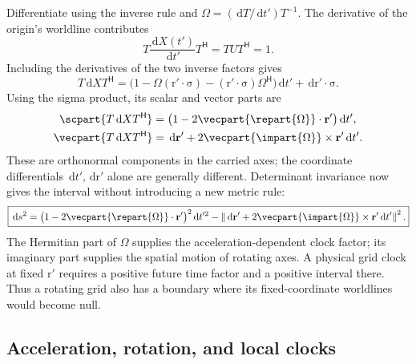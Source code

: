 \documentclass[11pt]{article}
\newcommand{\pv}[1]{{#1}}
\newcommand{\pvGreek}[1]{{#1}}
\newcommand{\vstyle}[1]{{\bm{\mathrm{#1}}}}
\newcommand{\pT}{\pv{T}}
\newcommand{\pU}{\pv{U}}
\newcommand{\pX}{\pv{X}}
\newcommand{\pvOmega}{\pvGreek{\Omega}}
\numberwithin{equation}{section}
\newcommand{\dotprod}{\cdot}
\newcommand{\bsig}{\vstyle{\sigma}}
\newcommand{\br}{\vstyle{r}}
\newcommand{\dd}{\,\mathrm d}
\begin{document}
Differentiate using the inverse rule and
$\pvOmega=(\dd\pT/\dd t')\pT^{-1}$. The derivative of the origin's
worldline contributes
\[
 \pT\frac{\dd\pX(t')}{\dd t'}\pT^{\mathsf H}
 =\pT\pU\pT^{\mathsf H}=1.
\]
Including the derivatives of the two inverse factors gives
\begin{equation}
 \boxed{\pT\dd\pX\pT^{\mathsf H}
 =\bigl(1-\pvOmega(\br'\dotprod\bsig)
 -(\br'\dotprod\bsig)\pvOmega^{\mathsf H}\bigr)\dd t'
 +\dd\br'\dotprod\bsig.}
 \label{eq:general-observer-increments}
\end{equation}
Using the sigma product, its scalar and vector parts are
\begin{align*}
 \scpart{\pT\dd\pX\pT^{\mathsf H}}
 &=\bigl(1-2\vecpart{\repart{\pvOmega}}\dotprod\br'\bigr)\dd t',\\
 \vecpart{\pT\dd\pX\pT^{\mathsf H}}
 &=\dd\br'+2\vecpart{\impart{\pvOmega}}\times\br'\dd t'.
\end{align*}
These are orthonormal components in the carried axes; the coordinate differentials
$\dd t',\dd\br'$ alone are generally different. Determinant invariance
now gives the interval without introducing a new metric rule:
\begin{equation}
 \boxed{\dd s^2
 =\bigl(1-2\vecpart{\repart{\pvOmega}}\dotprod\br'\bigr)^2\dd t'^2
 -\left\lVert\dd\br'+2\vecpart{\impart{\pvOmega}}\times\br'\dd t'\right\rVert^2.}
 \label{eq:general-observer-interval}
\end{equation}
The Hermitian part of $\pvOmega$ supplies the acceleration-dependent
clock factor; its imaginary part supplies the spatial motion of rotating
axes. A physical grid clock at fixed $\br'$ requires a positive future
time factor and a positive interval there. Thus a rotating grid also has
a boundary where its fixed-coordinate worldlines would become null.

\subsection{Acceleration, rotation, and local clocks}
\label{sec:observer-clock-geometry}
\end{document}
